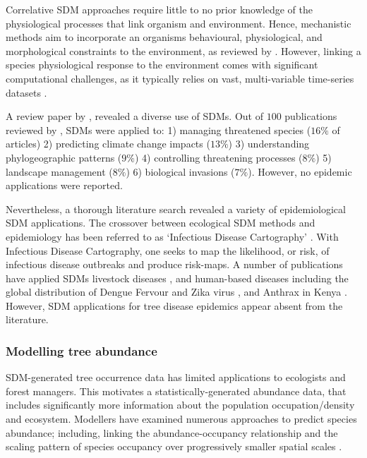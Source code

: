 Correlative SDM approaches require little to no prior knowledge of the physiological processes that link organism and environment.
Hence, mechanistic methods aim to incorporate an organisms behavioural, physiological, and morphological constraints to the environment, 
as reviewed by \cite{kearney2009mechanistic}. However, linking a species physiological response to the environment comes with significant
computational challenges, as it typically relies on vast, multi-variable time-series datasets \cite{shabani2016comparison}.

A review paper by \cite{guillera2015my}, revealed a diverse use of SDMs.
Out of $100$ publications reviewed by \cite{guillera2015my}, SDMs were applied to: 
1) managing threatened species ($16\% $ of articles) 
2) predicting climate change impacts ($13\%$) 
3) understanding phylogeographic patterns ($9\%$) 
4) controlling threatening processes ($8\%$) 
5) landscape management ($8\%$) 
6) biological invasions ($7\%$). However, no epidemic applications were reported.

Nevertheless, a thorough literature search revealed a variety of epidemiological SDM applications.
The crossover between ecological SDM methods and epidemiology has been referred to as `Infectious Disease Cartography' \cite{KRAEMER201619}.
With Infectious Disease Cartography, one seeks to map the likelihood, or risk, of infectious disease outbreaks and produce risk-maps.
A number of publications have applied SDMs livestock diseases \cite{hollings2017species}, and human-based diseases including the global 
distribution of Dengue Fervour \cite{bhatt2013global} and Zika virus \cite{messina2016mapping}, and Anthrax in Kenya \cite{otieno2021modeling}.
However, SDM applications for tree disease epidemics appear absent from the literature.

\subsubsection{Modelling tree abundance}

SDM-generated tree occurrence data has limited applications to ecologists and forest managers.
This motivates a statistically-generated abundance data, that includes significantly 
more information about the population occupation/density and ecosystem.
Modellers have examined numerous approaches to predict species abundance;
including, linking the abundance-occupancy relationship \cite{gaston2000abundance} and
the scaling pattern of species occupancy over progressively smaller spatial scales \cite{hui2009extrapolating}.

